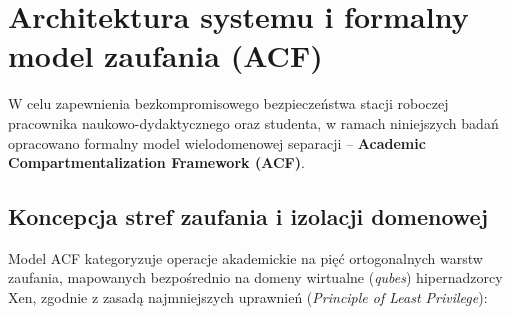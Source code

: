 \section{Architektura systemu i formalny model zaufania (ACF)}
\label{sec:architektura_i_model}

W celu zapewnienia bezkompromisowego bezpieczeństwa stacji roboczej pracownika naukowo-dydaktycznego oraz studenta, w ramach niniejszych badań opracowano formalny model wielodomenowej separacji -- \textbf{Academic Compartmentalization Framework (ACF)}.

\subsection{Koncepcja stref zaufania i izolacji domenowej}
Model ACF kategoryzuje operacje akademickie na pięć ortogonalnych warstw zaufania, mapowanych bezpośrednio na domeny wirtualne (\textit{qubes}) hipernadzorcy Xen, zgodnie z zasadą najmniejszych uprawnień (\textit{Principle of Least Privilege}):
